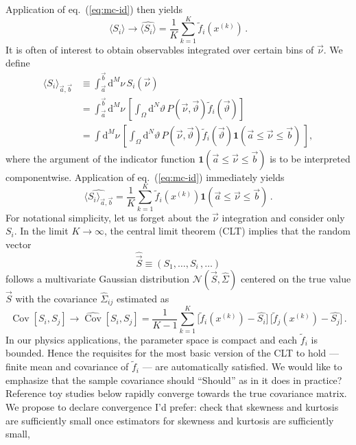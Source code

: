 \documentclass[aps,prd,reprint,nofootinbib,preprintnumbers]{revtex4}
\newcommand{\dual}[1]{\tilde{#1}}
\newcommand{\est}[1]{\widehat{#1}}
\newcommand{\nuvec}{\vec{\nu}}
\newcommand{\refeq}[1]{eq.~(\ref{eq:#1})}
\newcommand{\rmdx}[1]{\mbox{d} #1 \,} %
\newcommand{\thvec}{\vec{\vartheta}}
\renewcommand{\theta}{\vartheta}
\newcommand{\vecest}[1]{\widehat{\vec{#1}}}
\DeclareMathOperator{\cov}{Cov}
\newcommand{\fred}[1]{{\color{brown!85!black}#1}}
\begin{document}
Application of \refeq{mc-id} then yields
\begin{equation}
    \langle S_i\rangle \to \widehat{\langle S_i\rangle} = \frac{1}{K} \sum_{k=1}^{K} \dual{f}_i(x^{(k)})\,.
\end{equation}
It is often of interest to obtain observables integrated over certain
bins of $\nuvec$. We define
\begin{align}
    \langle S_i\rangle_{\vec{a},\vec{b}}
    & \equiv \int_{\vec{a}}^{\vec{b}} \rmdx{^M \nu} S_i(\nuvec)\\
    & = \int_{\vec{a}}^{\vec{b}} \rmdx{^M \nu} \left[\int_{\Omega} \rmdx{^N\theta} P(\nuvec,\thvec) \dual{f}_i(\thvec)  \right]\\
    & = \int \rmdx{^M \nu} \left[\int_{\Omega} \rmdx{^N\theta}  P(\nuvec,\thvec) \dual{f}_i(\thvec)
        \mathbf{1}(\vec{a} \le \nuvec \le \vec{b})\,
        \right],
\end{align}
where the argument of the indicator function $ \mathbf{1}(\vec{a} \le
\nuvec \le \vec{b})$ is to be interpreted componentwise.
Application of \refeq{mc-id} immediately yields
\begin{equation}
    \label{eq:bin-importance}
    \widehat{\langle S_i\rangle_{\vec{a},\vec{b}}}
    = \frac{1}{K} \sum_{k=1}^{K} \dual{f}_i(x^{(k)})         \mathbf{1}(\vec{a} \le \nuvec \le \vec{b})\,.
\end{equation}
For notational simplicity, let us forget about the $\nuvec$
integration and consider only $S_i$. In the limit $K \to \infty$, the
central limit theorem (CLT) implies that the random vector
\begin{equation}
  \label{eq:angular-obs-vec}
  \vecest{S} \equiv (S_1, \dots, S_i\,,
  \dots)
\end{equation}
follows a multivariate Gaussian distribution $\mathcal{N}( \vec{S},
\widehat{\Sigma})$ centered on the true value $\vec{S}$ with the
covariance $\widehat{\Sigma}_{ij}$ estimated as
\begin{equation}
    \cov[S_i,S_j] \to \est{\cov}[{S}_i, {S}_j]
        = \frac{1}{K - 1} \sum_{k=1}^{K} \big[\dual{f}_i(x^{(k)}) - \est{ S_i}\big]\,\big[\dual{f}_j(x^{(k)}) - \widehat{ S_j}\big]\,.
\end{equation}
In our physics applications, the parameter space is compact and each
$\dual{f}_i$ is bounded. Hence the requisites for the most basic
version of the CLT to hold --- finite mean and covariance of
$\dual{f}_i$ --- are automatically satisfied.  We would like to
emphasize that the sample covariance should \fred{``Should'' as in it
  does in practice? Reference toy studies below} rapidly converge
towards the true covariance matrix.  We propose to declare convergence
\fred{I'd prefer: check that skewness and kurtosis are sufficiently
  small} once estimators for skewness and kurtosis are sufficiently
small,
\end{document}
